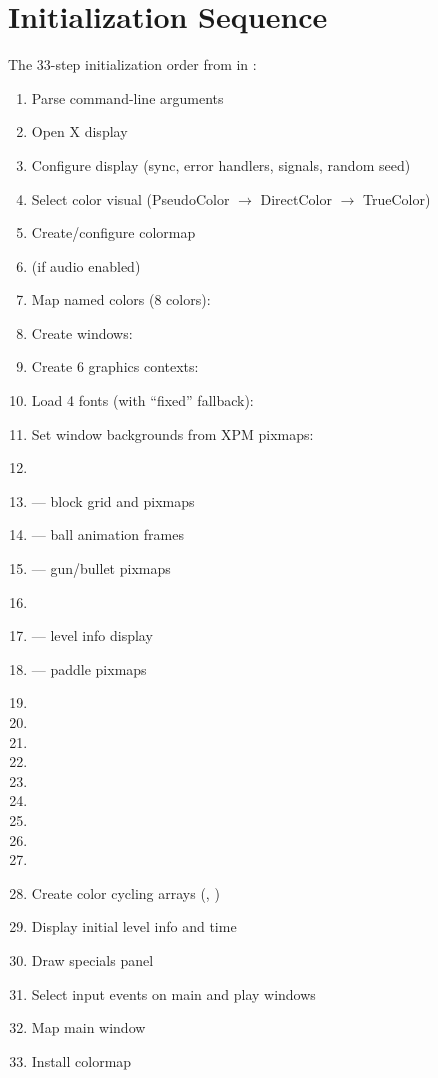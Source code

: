 \documentclass[11pt,a4paper]{article}
\begin{document}
\section{Initialization Sequence}
\label{sec:init-sequence}

The 33-step initialization order from  in  :

\begin{enumerate}[label=\arabic*., nosep]
  \item Parse command-line arguments
  \item Open X display
  \item Configure display (sync, error handlers, signals, random seed)
  \item Select color visual (PseudoColor $\to$ DirectColor $\to$ TrueColor)
  \item Create/configure colormap
  \item {} (if audio enabled)
  \item Map named colors (8 colors): 
  \item Create windows: 
  \item Create 6 graphics contexts: 
  \item Load 4 fonts (with ``fixed'' fallback): 
  \item Set window backgrounds from XPM pixmaps: 
  \item {}
  \item {} --- block grid and pixmaps
  \item {} --- ball animation frames
  \item {} --- gun/bullet pixmaps
  \item {}
  \item {} --- level info display
  \item {} --- paddle pixmaps
  \item {}
  \item {}
  \item {}
  \item {}
  \item {}
  \item {}
  \item {}
  \item {}
  \item {}
  \item Create color cycling arrays (, )
  \item Display initial level info and time
  \item Draw specials panel
  \item Select input events on main and play windows
  \item Map main window
  \item Install colormap
\end{enumerate}
\end{document}
